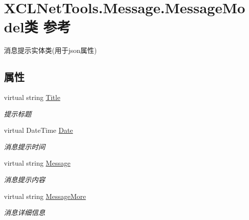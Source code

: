 \hypertarget{class_x_c_l_net_tools_1_1_message_1_1_message_model}{\section{X\-C\-L\-Net\-Tools.\-Message.\-Message\-Model类 参考}
\label{class_x_c_l_net_tools_1_1_message_1_1_message_model}
}


消息提示实体类(用于json属性)  


\subsection*{属性}
\begin{DoxyCompactItemize}
\item 
virtual string \hyperlink{class_x_c_l_net_tools_1_1_message_1_1_message_model_a2347b5cf1ac7736de79aa94abd252d85}{Title}
\begin{DoxyCompactList}\small\item\em 提示标题 \end{DoxyCompactList}\item 
virtual Date\-Time \hyperlink{class_x_c_l_net_tools_1_1_message_1_1_message_model_a04ede00490c3dbabea1fc01e6150715a}{Date}
\begin{DoxyCompactList}\small\item\em 消息提示时间 \end{DoxyCompactList}\item 
virtual string \hyperlink{class_x_c_l_net_tools_1_1_message_1_1_message_model_a1fb1dde64c832e59d688d9a9fe944da5}{Message}
\begin{DoxyCompactList}\small\item\em 消息提示内容 \end{DoxyCompactList}\item 
virtual string \hyperlink{class_x_c_l_net_tools_1_1_message_1_1_message_model_ae30c575345756a20443bb2f26ecdf1e9}{Message\-More}
\begin{DoxyCompactList}\small\item\em 消息详细信息 \end{DoxyCompactList}\item 

\end{DoxyCompactItemize}
